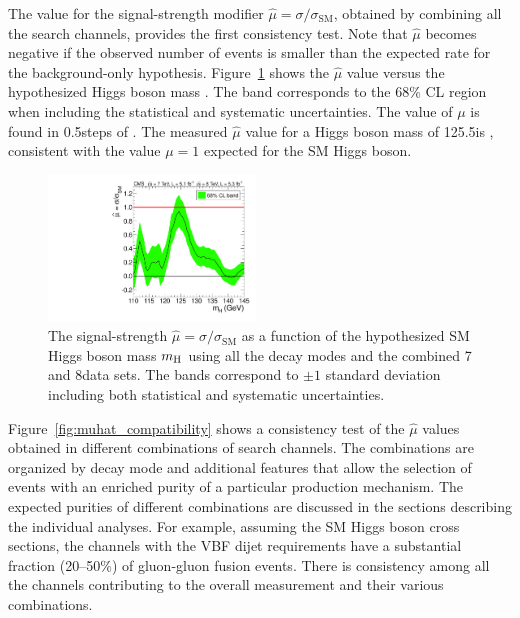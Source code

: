 \documentclass[11pt,twoside,a4paper,cmspaper,final,collab]{cms-tdr}
\begin{document}
The value for the signal-strength modifier $\hat \mu = \sigma / \sigma_{\mathrm{SM}}$,
obtained by combining  all the search channels,
provides the first consistency test.
Note that $\hat \mu$ becomes negative if the observed number of events is
smaller than the expected rate for the background-only hypothesis.
Figure~\ref{fig:muhat} shows
the $\hat \mu$ value versus the hypothesized
Higgs boson mass \mH. The band corresponds to the 68\% CL region when including the statistical and
systematic  uncertainties.
The value of $\mu$ is found in 0.5\GeV steps of \mH. The measured $\hat \mu$ value
for a Higgs boson mass of 125.5\GeV is  \MUHAT,
consistent with the value $\mu=1$ expected for the SM Higgs boson.

\begin{figure} [htbp]
\centering
\includegraphics[width=0.49\textwidth]{figures/comb/sqr_mlz_comb_HPA_smallGGScale_1}
\caption{
	The signal-strength $\hat \mu = \sigma / \sigma_\mathrm{SM}$
	as a function of the hypothesized
        SM Higgs boson mass $m_{\mathrm{H}}$ using all the decay modes and the combined 7 and 8\TeV data sets.
	The bands correspond to ${\pm}1$ standard deviation including both statistical and systematic uncertainties.
    }
\label{fig:muhat}
\end{figure}

Figure~\ref{fig:muhat_compatibility} shows a consistency test of
the $\hat \mu$ values obtained in different combinations of search channels.
The combinations are organized by decay mode and additional features that
allow the selection of events with an enriched purity of a particular production mechanism.
The expected purities of different combinations
are discussed in the sections describing the individual analyses.
For example, assuming the SM Higgs boson cross sections,
the channels with the VBF dijet requirements have a substantial fraction (20--50\%)
of gluon-gluon fusion events. There is consistency
among all the channels contributing to the overall measurement and their various combinations.
\end{document}
